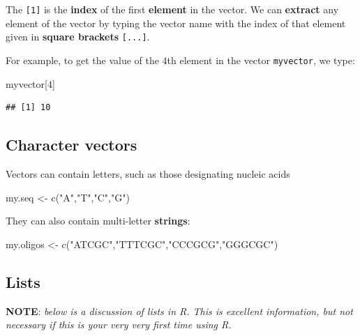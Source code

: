 \documentclass[
]{book}
\newenvironment{Shaded}{\begin{snugshade}}{\end{snugshade}}
\newcommand{\DecValTok}[1]{\textcolor[rgb]{0.00,0.00,0.81}{#1}}
\newcommand{\FunctionTok}[1]{\textcolor[rgb]{0.00,0.00,0.00}{#1}}
\newcommand{\NormalTok}[1]{#1}
\newcommand{\OtherTok}[1]{\textcolor[rgb]{0.56,0.35,0.01}{#1}}
\newcommand{\StringTok}[1]{\textcolor[rgb]{0.31,0.60,0.02}{#1}}
\begin{document}
The \texttt{{[}1{]}} is the \textbf{index} of the first \textbf{element} in the vector. We can \textbf{extract} any element of the vector by typing the vector name with the index of that element given in \textbf{square brackets} \texttt{{[}...{]}}.

For example, to get the value of the 4th element in the vector \texttt{myvector}, we type:

\begin{Shaded}
\begin{Highlighting}[]
\NormalTok{myvector[}\DecValTok{4}\NormalTok{]}
\end{Highlighting}
\end{Shaded}

\begin{verbatim}
## [1] 10
\end{verbatim}

\hypertarget{character-vectors}{%
\subsection{Character vectors}\label{character-vectors}}

Vectors can contain letters, such as those designating nucleic acids

\begin{Shaded}
\begin{Highlighting}[]
\NormalTok{my.seq }\OtherTok{\textless{}{-}} \FunctionTok{c}\NormalTok{(}\StringTok{"A"}\NormalTok{,}\StringTok{"T"}\NormalTok{,}\StringTok{"C"}\NormalTok{,}\StringTok{"G"}\NormalTok{)}
\end{Highlighting}
\end{Shaded}

They can also contain multi-letter \textbf{strings}:

\begin{Shaded}
\begin{Highlighting}[]
\NormalTok{my.oligos }\OtherTok{\textless{}{-}} \FunctionTok{c}\NormalTok{(}\StringTok{"ATCGC"}\NormalTok{,}\StringTok{"TTTCGC"}\NormalTok{,}\StringTok{"CCCGCG"}\NormalTok{,}\StringTok{"GGGCGC"}\NormalTok{)}
\end{Highlighting}
\end{Shaded}

\hypertarget{lists}{%
\subsection{Lists}\label{lists}}

\textbf{NOTE}: \emph{below is a discussion of lists in R. This is excellent information, but not necessary if this is your very very first time using R.}
\end{document}
